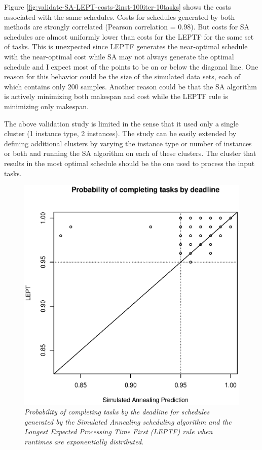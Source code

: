 \documentclass[12pt]{report}
\begin{document}
Figure \ref{fig:validate-SA-LEPT-costs-2inst-100iter-10tasks} shows the costs associated with the same schedules. 
Costs for schedules generated by both methods are strongly correlated (Pearson correlation = 0.98).
But costs for SA schedules are almost uniformly lower than costs for the LEPTF for the same set of tasks.
This is unexpected since LEPTF generates the near-optimal schedule with the near-optimal cost while SA may not always generate the optimal schedule and I expect most of the points to be on or below the diagonal line.
One reason for this behavior could be the size of the simulated data sets, each of which contains only 200 samples.
Another reason could be that the SA algorithm is actively minimizing both makespan and cost while the LEPTF rule is minimizing only makespan.

The above validation study is limited in the sense that it used only a single cluster (1 instance type, 2 instances). The study can be easily extended by defining additional clusters by varying the instance type or number of instances or both and running the SA algorithm on each of these clusters. The cluster that results in the most optimal schedule should be the one used to process the input tasks.

\begin{figure}
\includegraphics[width=1\textwidth]{validate-SA-LEPT-scores-2inst-100iter-10tasks.eps}
\caption{\textit{Probability of completing tasks by the deadline for schedules generated by the Simulated Annealing scheduling algorithm and the Longest Expected Processing Time First (LEPTF) rule when runtimes are exponentially distributed.}}
\label{fig:validate-SA-LEPT-scores-2inst-100iter-10tasks}
\end{figure}
\end{document}
